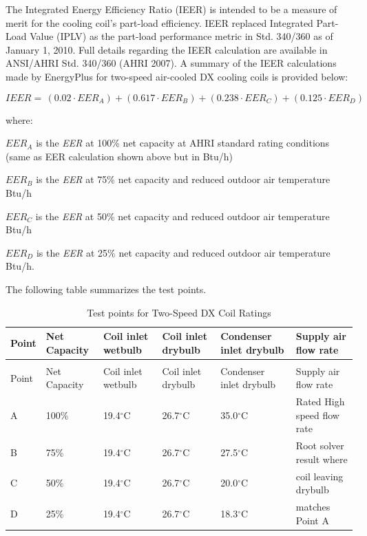 The Integrated Energy Efficiency Ratio (IEER) is intended to be a measure of merit for the cooling coil's part-load efficiency. IEER replaced Integrated Part-Load Value (IPLV) as the part-load performance metric in Std. 340/360 as of January 1, 2010. Full details regarding the IEER calculation are available in ANSI/AHRI Std. 340/360 (AHRI 2007). A summary of the IEER calculations made by EnergyPlus for two-speed air-cooled DX cooling coils is provided below:

\begin{equation}
  IEER = \,(0.02 \cdot EE{R_A}) + (0.617 \cdot EE{R_B}) + (0.238 \cdot EE{R_C}) + (0.125 \cdot EE{R_D})
\end{equation}

where:

\(EER_A\) is the \emph{EER} at 100\% net capacity at AHRI standard rating conditions (same as EER calculation shown above but in Btu/h)

\(EER_B\) is the \emph{EER} at 75\% net capacity and reduced outdoor air temperature Btu/h

\(EER_C\) is the \emph{EER} at 50\% net capacity and reduced outdoor air temperature Btu/h

\(EER_D\) is the \emph{EER} at 25\% net capacity and reduced outdoor air temperature Btu/h.

The following table summarizes the test points.

\begin{longtable}[c]{p{0.8in}p{0.8in}p{0.8in}p{0.8in}p{0.8in}p{2.0in}}
\caption{Test points for Two-Speed DX Coil Ratings \label{table:test-points-for-two-speed-dx-coil-ratings}} \tabularnewline
\toprule 
Point & Net Capacity & Coil inlet wetbulb & Coil inlet drybulb & Condenser inlet drybulb & Supply air flow rate \tabularnewline
\midrule
\endfirsthead

\caption[]{Test points for Two-Speed DX Coil Ratings} \tabularnewline
\toprule 
Point & Net Capacity & Coil inlet wetbulb & Coil inlet drybulb & Condenser inlet drybulb & Supply air flow rate \tabularnewline
\midrule
\endhead

A & 100\% & 19.4\(^{\circ}\)C & 26.7\(^{\circ}\)C & 35.0\(^{\circ}\)C & Rated High speed flow rate \tabularnewline
\midrule
B & 75\% & 19.4\(^{\circ}\)C & 26.7\(^{\circ}\)C & 27.5\(^{\circ}\)C & Root solver result where \tabularnewline
C & 50\% & 19.4\(^{\circ}\)C & 26.7\(^{\circ}\)C & 20.0\(^{\circ}\)C & coil leaving drybulb\tabularnewline
D & 25\% & 19.4\(^{\circ}\)C & 26.7\(^{\circ}\)C & 18.3\(^{\circ}\)C & matches Point A\tabularnewline
\bottomrule
\end{longtable}

